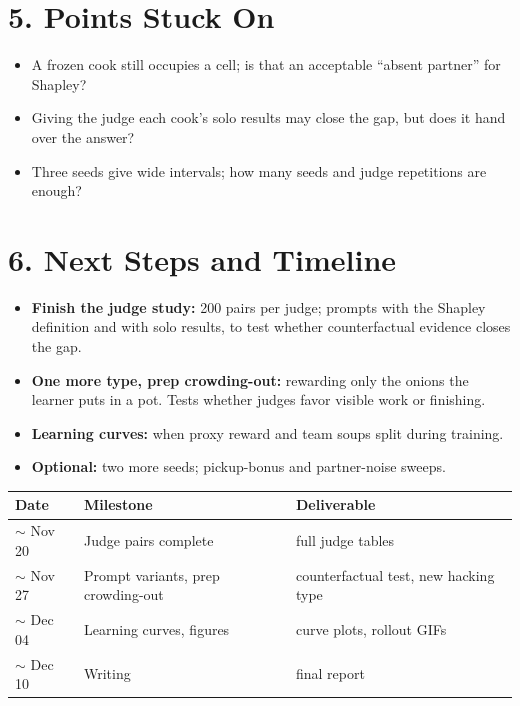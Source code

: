 \documentclass[10pt]{article}
\begin{document}
\section*{5. Points Stuck On}
\begin{itemize}
\item A frozen cook still occupies a cell; is that an acceptable ``absent partner'' for Shapley?
\item Giving the judge each cook's solo results may close the gap, but does it hand over the answer?
\item Three seeds give wide intervals; how many seeds and judge repetitions are enough?
\end{itemize}

\section*{6. Next Steps and Timeline}
\begin{itemize}
\item \textbf{Finish the judge study:} 200 pairs per judge; prompts with the Shapley definition and
      with solo results, to test whether counterfactual evidence closes the gap.
\item \textbf{One more type, prep crowding-out:} rewarding only the onions the learner puts in a pot.
      Tests whether judges favor visible work or finishing.
\item \textbf{Learning curves:} when proxy reward and team soups split during training.
\item \textbf{Optional:} two more seeds; pickup-bonus and partner-noise sweeps.
\end{itemize}
\begin{center}\small
\begin{tabular}{@{}lll@{}}
\toprule
Date & Milestone & Deliverable \\
\midrule
$\sim$ Nov 20 & Judge pairs complete & full judge tables \\
$\sim$ Nov 27 & Prompt variants, prep crowding-out & counterfactual test, new hacking type \\
$\sim$ Dec 04 & Learning curves, figures & curve plots, rollout GIFs \\
$\sim$ Dec 10 & Writing & final report \\
\bottomrule
\end{tabular}
\end{center}
\end{document}
